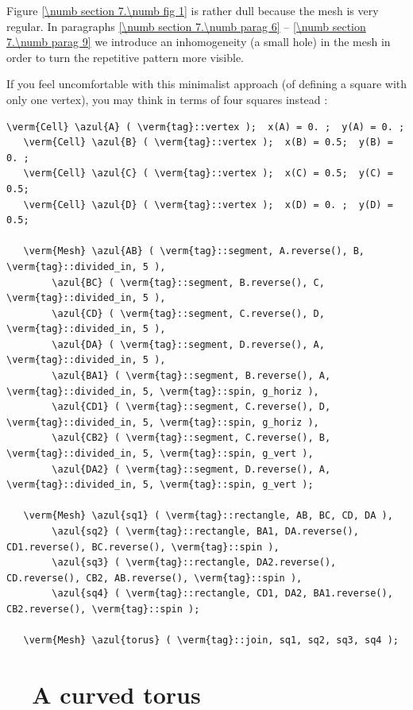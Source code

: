 Figure \ref{\numb section 7.\numb fig 1} is rather dull because the mesh is very regular.
In paragraphs \ref{\numb section 7.\numb parag 6} -- \ref{\numb section 7.\numb parag 9}
we introduce an inhomogeneity (a small hole) in the mesh in order to turn the repetitive pattern
more visible.

If you feel uncomfortable with this minimalist approach (of defining a square with only one
vertex), you may think in terms of four squares instead :

\begin{Verbatim}[commandchars=\\\{\},formatcom=\small\tt,
   baselinestretch=0.94,framesep=2mm                      ]
   \verm{Cell} \azul{A} ( \verm{tag}::vertex );  x(A) = 0. ;  y(A) = 0. ;
   \verm{Cell} \azul{B} ( \verm{tag}::vertex );  x(B) = 0.5;  y(B) = 0. ;
   \verm{Cell} \azul{C} ( \verm{tag}::vertex );  x(C) = 0.5;  y(C) = 0.5;
   \verm{Cell} \azul{D} ( \verm{tag}::vertex );  x(D) = 0. ;  y(D) = 0.5;
   
   \verm{Mesh} \azul{AB} ( \verm{tag}::segment, A.reverse(), B, \verm{tag}::divided_in, 5 ),
        \azul{BC} ( \verm{tag}::segment, B.reverse(), C, \verm{tag}::divided_in, 5 ),
        \azul{CD} ( \verm{tag}::segment, C.reverse(), D, \verm{tag}::divided_in, 5 ),
        \azul{DA} ( \verm{tag}::segment, D.reverse(), A, \verm{tag}::divided_in, 5 ),
        \azul{BA1} ( \verm{tag}::segment, B.reverse(), A, \verm{tag}::divided_in, 5, \verm{tag}::spin, g_horiz ),
        \azul{CD1} ( \verm{tag}::segment, C.reverse(), D, \verm{tag}::divided_in, 5, \verm{tag}::spin, g_horiz ),
        \azul{CB2} ( \verm{tag}::segment, C.reverse(), B, \verm{tag}::divided_in, 5, \verm{tag}::spin, g_vert ),
        \azul{DA2} ( \verm{tag}::segment, D.reverse(), A, \verm{tag}::divided_in, 5, \verm{tag}::spin, g_vert );

   \verm{Mesh} \azul{sq1} ( \verm{tag}::rectangle, AB, BC, CD, DA ),
        \azul{sq2} ( \verm{tag}::rectangle, BA1, DA.reverse(), CD1.reverse(), BC.reverse(), \verm{tag}::spin ),
        \azul{sq3} ( \verm{tag}::rectangle, DA2.reverse(), CD.reverse(), CB2, AB.reverse(), \verm{tag}::spin ),
        \azul{sq4} ( \verm{tag}::rectangle, CD1, DA2, BA1.reverse(), CB2.reverse(), \verm{tag}::spin );
	
   \verm{Mesh} \azul{torus} ( \verm{tag}::join, sq1, sq2, sq3, sq4 );
\end{Verbatim}


\section{~~A curved torus}\label{\numb section 7.\numb parag 5}

